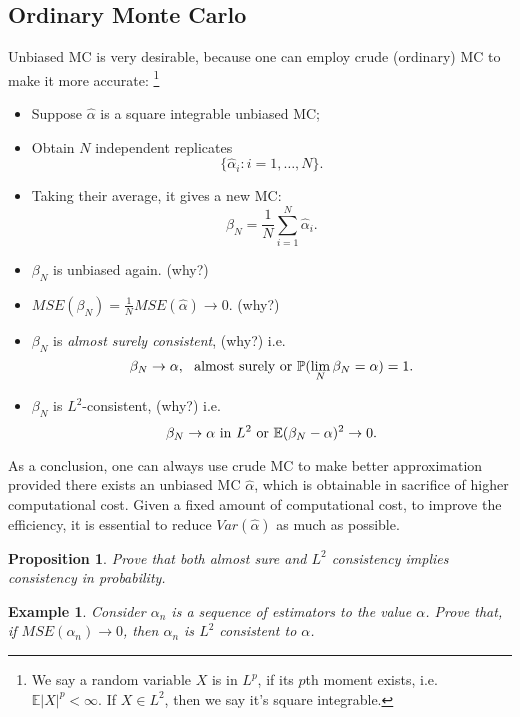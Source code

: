 \documentclass{article}
\newtheorem{proposition}[theorem]{Proposition}
\newtheorem{example}{Example}
\begin{document}
\subsection{Ordinary Monte Carlo}
Unbiased MC is very desirable, because one can employ crude (ordinary) MC
to make it more accurate:
\footnote{We say a random variable $X$ is in $L^p$, if its $p$th moment exists, 
i.e. $\mathbb E |X|^p <\infty .$
If $X\in L^2$, then we say it's square integrable.}
\begin{itemize}
 \item Suppose $\hat \alpha$ is a square integrable unbiased MC;
 \item Obtain $N$ independent replicates
 $$\{\hat \alpha_i: i = 1,\ldots, N\}.$$
 \item Taking their average, it gives a new MC:
 $$\beta_N = \frac 1 N \sum_{i=1}^N \hat \alpha_i.$$
 \item $\beta_N$ is unbiased again. (why?)
 \item $MSE(\beta_N) = \frac 1 N MSE(\hat \alpha) \to 0$. (why?)
 \item $\beta_N$ is {\it  almost surely consistent},
  (why?)  i.e. 
  $$\beta_{N} \to \alpha, \ \hbox{ almost surely  or }
  \mathbb P(\lim_N \beta_N = \alpha) = 1.$$
  \item $\beta_N$ is $L^2$-consistent,  (why?) i.e.
  $$\beta_{N} \to \alpha \hbox{ in } L^{2} \hbox{ or }
  \mathbb E (\beta_N - \alpha)^2 \to 0.$$
\end{itemize}



As a conclusion, one can always use crude MC to make better approximation provided there exists an unbiased MC $\hat \alpha$, which is obtainable in sacrifice of  higher computational cost.
Given a fixed amount of computational cost, to improve the efficiency, it is essential to reduce $Var(\hat \alpha)$ as much as possible.

\begin{proposition}
Prove that both almost sure and $L^2$ consistency implies consistency in probability. 
\end{proposition}

\begin{example}
 Consider $\alpha_{n}$ is a sequence of estimators to the value $\alpha$. 
 Prove that, if $MSE(\alpha_{n}) \to 0$, then $\alpha_{n}$ is $L^{2}$ consistent to $\alpha$.
\end{example}
\end{document}
